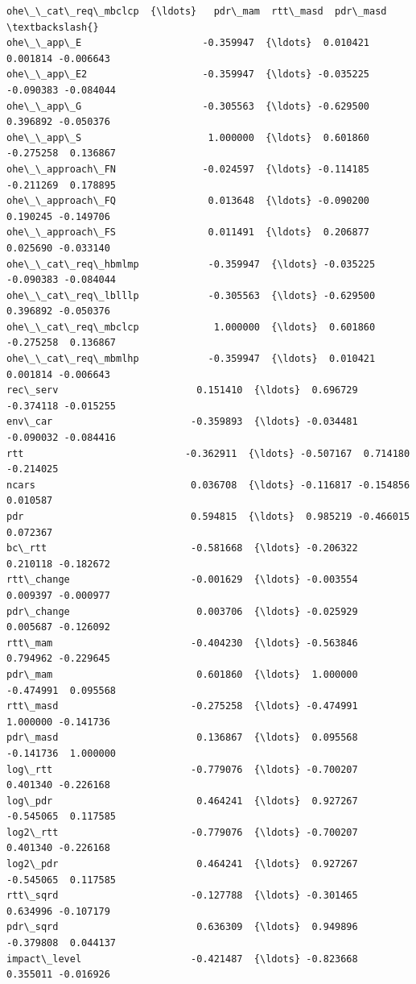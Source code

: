 \documentclass[11pt]{article}
\begin{document}
\begin{tcolorbox}[breakable, size=fbox, boxrule=.5pt, pad at break*=1mm, opacityfill=0]
\begin{Verbatim}[commandchars=\\\{\}]
                     ohe\_\_cat\_req\_mbclcp  {\ldots}   pdr\_mam  rtt\_masd  pdr\_masd  \textbackslash{}
ohe\_\_app\_E                     -0.359947  {\ldots}  0.010421  0.001814 -0.006643
ohe\_\_app\_E2                    -0.359947  {\ldots} -0.035225 -0.090383 -0.084044
ohe\_\_app\_G                     -0.305563  {\ldots} -0.629500  0.396892 -0.050376
ohe\_\_app\_S                      1.000000  {\ldots}  0.601860 -0.275258  0.136867
ohe\_\_approach\_FN               -0.024597  {\ldots} -0.114185 -0.211269  0.178895
ohe\_\_approach\_FQ                0.013648  {\ldots} -0.090200  0.190245 -0.149706
ohe\_\_approach\_FS                0.011491  {\ldots}  0.206877  0.025690 -0.033140
ohe\_\_cat\_req\_hbmlmp            -0.359947  {\ldots} -0.035225 -0.090383 -0.084044
ohe\_\_cat\_req\_lblllp            -0.305563  {\ldots} -0.629500  0.396892 -0.050376
ohe\_\_cat\_req\_mbclcp             1.000000  {\ldots}  0.601860 -0.275258  0.136867
ohe\_\_cat\_req\_mbmlhp            -0.359947  {\ldots}  0.010421  0.001814 -0.006643
rec\_serv                        0.151410  {\ldots}  0.696729 -0.374118 -0.015255
env\_car                        -0.359893  {\ldots} -0.034481 -0.090032 -0.084416
rtt                            -0.362911  {\ldots} -0.507167  0.714180 -0.214025
ncars                           0.036708  {\ldots} -0.116817 -0.154856  0.010587
pdr                             0.594815  {\ldots}  0.985219 -0.466015  0.072367
bc\_rtt                         -0.581668  {\ldots} -0.206322  0.210118 -0.182672
rtt\_change                     -0.001629  {\ldots} -0.003554  0.009397 -0.000977
pdr\_change                      0.003706  {\ldots} -0.025929  0.005687 -0.126092
rtt\_mam                        -0.404230  {\ldots} -0.563846  0.794962 -0.229645
pdr\_mam                         0.601860  {\ldots}  1.000000 -0.474991  0.095568
rtt\_masd                       -0.275258  {\ldots} -0.474991  1.000000 -0.141736
pdr\_masd                        0.136867  {\ldots}  0.095568 -0.141736  1.000000
log\_rtt                        -0.779076  {\ldots} -0.700207  0.401340 -0.226168
log\_pdr                         0.464241  {\ldots}  0.927267 -0.545065  0.117585
log2\_rtt                       -0.779076  {\ldots} -0.700207  0.401340 -0.226168
log2\_pdr                        0.464241  {\ldots}  0.927267 -0.545065  0.117585
rtt\_sqrd                       -0.127788  {\ldots} -0.301465  0.634996 -0.107179
pdr\_sqrd                        0.636309  {\ldots}  0.949896 -0.379808  0.044137
impact\_level                   -0.421487  {\ldots} -0.823668  0.355011 -0.016926


\end{Verbatim}
\end{tcolorbox}
\end{document}
